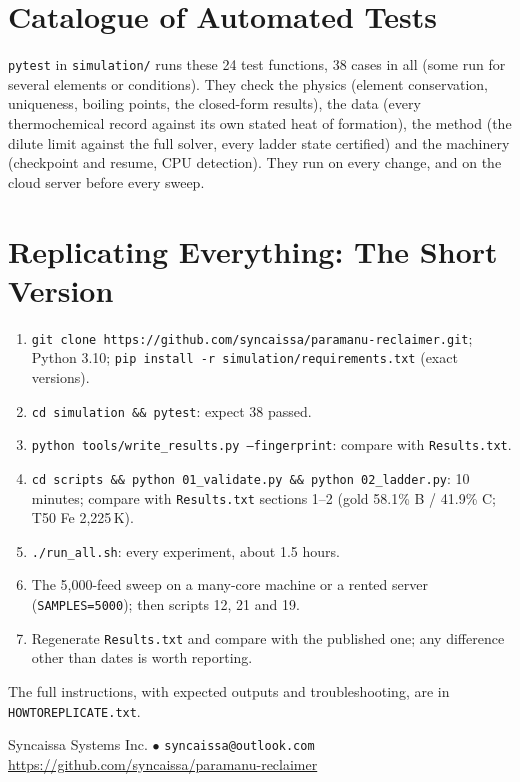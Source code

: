 \documentclass[11pt,a4paper]{article}
\begin{document}
\section{Catalogue of Automated Tests}\label{app:tests}
\texttt{pytest} in \texttt{simulation/} runs these 24 test functions, 38 cases in all (some run for several elements or conditions). They check the physics (element conservation, uniqueness, boiling points, the closed-form results), the data (every thermochemical record against its own stated heat of formation), the method (the dilute limit against the full solver, every ladder state certified) and the machinery (checkpoint and resume, CPU detection). They run on every change, and on the cloud server before every sweep.


\section{Replicating Everything: The Short Version}
\begin{enumerate}
\item \texttt{git clone https://github.com/syncaissa/paramanu-reclaimer.git}; Python 3.10; \texttt{pip install -r simulation/requirements.txt} (exact versions).
\item \texttt{cd simulation \&\& pytest}: expect 38 passed.
\item \texttt{python tools/write\_results.py --fingerprint}: compare with \texttt{Results.txt}.
\item \texttt{cd scripts \&\& python 01\_validate.py \&\& python 02\_ladder.py}: 10 minutes; compare with \texttt{Results.txt} sections 1--2 (gold 58.1\% B / 41.9\% C; T50 Fe 2,225\,K).
\item \texttt{./run\_all.sh}: every experiment, about 1.5 hours.
\item The 5,000-feed sweep on a many-core machine or a rented server (\texttt{SAMPLES=5000}); then scripts 12, 21 and 19.
\item Regenerate \texttt{Results.txt} and compare with the published one; any difference other than dates is worth reporting.
\end{enumerate}
The full instructions, with expected outputs and troubleshooting, are in \texttt{HOWTOREPLICATE.txt}.




\begin{pclosing}
Syncaissa Systems Inc. \quad $\bullet$ \quad \texttt{syncaissa@outlook.com}\\[2pt]
\url{https://github.com/syncaissa/paramanu-reclaimer}
\end{pclosing}
\end{document}
